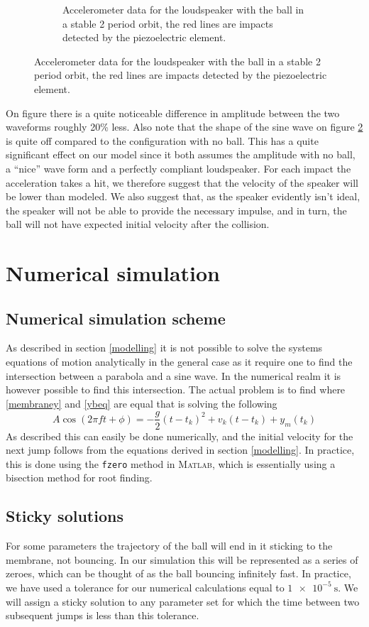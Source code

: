 \documentclass[12pt,oneside,a4paper]{article}
\numberwithin{equation}{section}
\begin{document}
{{{{\begin{figure}[h]
\begin{subfigure}[t]{0.49\textwidth}
	\caption{Accelerometer data for the loudspeaker with the ball in a stable 2 period orbit, the red lines are impacts detected by the piezoelectric element.}
	\label{wball}
\end{subfigure}
\end{figure}
On figure there is a quite noticeable difference in amplitude between the two 
waveforms roughly 20\% less. Also note that the shape of the sine wave on 
figure \ref{wball} is quite off compared to the configuration with no ball. 
This has a quite significant effect on our model since it both assumes the 
amplitude with no ball, a ``nice'' wave form and a perfectly compliant 
loudspeaker. For each impact the acceleration takes a hit, we therefore suggest 
that the velocity of the speaker will be lower than modeled. We also suggest 
that, as the speaker evidently isn't ideal, the speaker will not be able to 
provide the necessary impulse, and in turn, the ball will not have expected 
initial velocity after the collision.
 
\section{Numerical simulation}
\label{Numericalsec}
\subsection{Numerical simulation scheme}
As described in section \ref{modelling} it is not possible to solve the systems 
equations of motion analytically in the general case as it require one to find 
the intersection between a parabola and a sine wave. In the numerical realm it 
is however possible to find this intersection. The actual problem is to find 
where \eqref{membraney} and \eqref{ybeq} are equal that is solving the following
\begin{equation}
	A \cos(2\pi f t+ \phi) = -\frac{g}{2}(t-t_k)^2+v_k(t-t_k)+y_m(t_k)
\end{equation}
As described this can easily be done numerically, and the initial velocity for the next jump follows from the equations derived in section \ref{modelling}. In practice, this is done using the \texttt{fzero} method in \textsc{Matlab}, which is essentially using a bisection method for root finding.

\subsection{Sticky solutions}
For some parameters the trajectory of the ball will end in it sticking to the 
membrane, not bouncing. In our simulation this will be represented as a series 
of zeroes, which can be thought of as the ball bouncing infinitely fast. In 
practice, we have used a tolerance for our numerical calculations equal to $\SI{1e-5}{\second}$. We will assign a sticky solution to any parameter set 
for which the time between two subsequent jumps is less than this tolerance. 
}}}}
\end{document}
